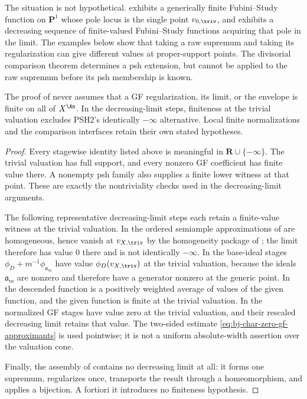 The situation is not hypothetical.  
exhibits a generically finite Fubini--Study function on $\mathbf P^1$ whose
pole locus is the single point $v_{0,\triv}$, and
 exhibits a decreasing sequence of
finite-valued Fubini--Study functions acquiring that pole in the limit.
The examples below show that taking a raw supremum and taking its
regularization can give different values at proper-support points.  The
divisorial comparison theorem determines a psh extension, but cannot be
applied to the raw supremum before its psh membership is known.

\begin{proposition}\label{prop:bj-final-no-hidden-finiteness}
The proof of  never assumes that a GF
regularization, its limit, or the envelope is finite on all of
$X^{\An}$.
In the decreasing-limit steps, finiteness at the trivial valuation
excludes PSH2's identically $-\infty$ alternative.  Local finite
normalizations and the comparison interfaces retain their own stated
hypotheses.
\end{proposition}

\begin{proof}
Every stagewise identity listed above is meaningful in
$\mathbf R\cup\{-\infty\}$.
The trivial valuation has full support, and every nonzero GF coefficient has
finite value there.
A nonempty psh family also supplies a finite lower witness at that point.
These are exactly the nontriviality checks used in the decreasing-limit
arguments.

The following representative decreasing-limit steps each retain a
finite-value witness at the trivial valuation.
In  the ordered semiample approximations
of  are homogeneous, hence
vanish at $v_{X,\triv}$ by the homogeneity package of
; the limit therefore has value $0$
there and is not identically $-\infty$.
In  the base-ideal stages
$\phi_D+m^{-1}\phi_{\mathfrak a_m}$ have value $\phi_D(v_{X,\triv})$ at
the trivial valuation, because the ideals $\mathfrak a_m$ are nonzero and
therefore have a generator nonzero at the generic point.
In  the descended function is a positively
weighted average of values of the given function, and the given function is
finite at the trivial valuation.
In  the normalized GF stages have value zero at the trivial valuation,
and their rescaled decreasing limit retains that value.  The two-sided
estimate \eqref{eq:bj-char-zero-gf-approximants} is used pointwise; it is
not a uniform absolute-width assertion over the valuation cone.

Finally, the assembly of  contains no decreasing
limit at all: it forms one supremum, regularizes once, transports the result
through a homeomorphism, and applies a bijection.  A fortiori it introduces
no finiteness hypothesis.
\end{proof}

